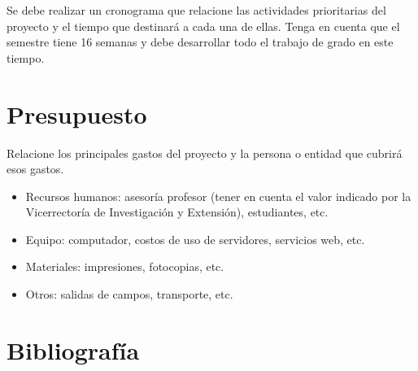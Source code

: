 \documentclass[12pt]{article}
\begin{document}
    Se debe realizar un cronograma que relacione las actividades prioritarias del proyecto y el tiempo que destinará a cada una de ellas. Tenga en cuenta que el semestre tiene 16 semanas y debe desarrollar todo el trabajo de grado en este tiempo. 

    \section{Presupuesto}

    Relacione los principales gastos del proyecto y la persona o entidad que cubrirá esos gastos.

    \begin{itemize}
        
        \item Recursos humanos:  asesoría profesor (tener en cuenta el valor indicado por la Vicerrectoría de Investigación y Extensión), estudiantes, etc.
        \item Equipo:  computador, costos de uso de servidores, servicios web, etc.
        \item Materiales:  impresiones, fotocopias, etc.
        \item Otros:  salidas de campos, transporte, etc.
        
    \end{itemize}

    \pagebreak

    \section{Bibliografía}

    \begingroup
    \renewcommand{\section}[2]{}
    \renewcommand{\addcontentsline}[3]{}
    
    \endgroup
\end{document}
